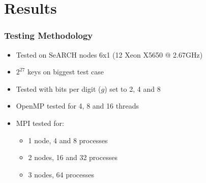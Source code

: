 \section{Results}

\begin{frame}
	\frametitle{Testing Methodology}

\begin{itemize}\itemsep=10pt
		\item Tested on SeARCH nodes 6x1 (12 Xeon X5650 @ 2.67GHz)
		\item $2^{27}$ keys on biggest test case
		\item Tested with bits per digit ($g$) set to 2, 4 and 8
		\item OpenMP tested for 4, 8 and 16 threads
		\item MPI tested for:
		\begin{itemize}
			\item 1 node, 4 and 8 processes
			\item 2 nodes, 16 and 32 processes
			\item 3 nodes, 64 processes
		\end{itemize}
	\end{itemize}
\end{frame}
